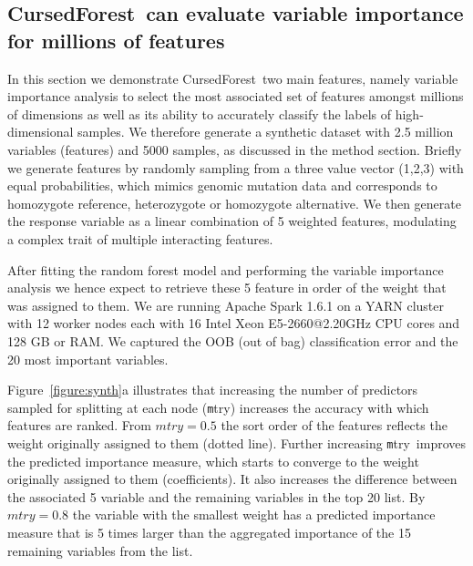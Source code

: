 \documentclass[10pt,letterpaper]{article}
\newcommand{\cursedforest}{{\sc CursedForest}}
\newcommand{\mtry}{{\texttt mtry}}
\newcommand{\ntree}{{\texttt ntree}}
\begin{document}
\subsection{\cursedforest\ can evaluate variable importance for millions of features}\label{synthetic}
In this section we demonstrate \cursedforest\ two main features, namely variable importance analysis to select the most
associated set of features amongst millions of dimensions as well as its ability to accurately classify the labels of
high-dimensional samples.
We therefore generate a synthetic dataset with 2.5 million variables (features) and 5000 samples, as discussed in the
method section.  Briefly we generate features by randomly sampling from a three value vector (1,2,3) with equal
probabilities, which mimics genomic mutation data and corresponds to homozygote reference, heterozygote or homozygote
alternative.  We then generate the response variable as a linear combination of 5 weighted features, modulating a
complex trait of multiple interacting features.

After fitting the random forest model and performing the variable importance analysis we hence expect to retrieve these
5 feature in order of the weight that was assigned to them.  We are running Apache Spark 1.6.1 on a YARN cluster with 12
worker nodes each with 16 Intel Xeon E5-2660@2.20GHz CPU cores and 128 GB or RAM.  We captured the OOB (out of bag)
classification error and the 20 most important variables.

Figure~\ref{figure:synth}a illustrates that increasing the number of predictors sampled for splitting at each node
(\mtry) increases the accuracy with which features are ranked.  From $mtry=0.5$ the sort order of the features reflects
the weight originally assigned to them (dotted line). Further increasing \mtry\ improves the predicted importance
measure, which starts to converge to the weight originally assigned to them (coefficients).  It also increases the
difference between the associated 5 variable and the remaining variables in the top 20 list.  By $mtry=0.8$ the variable
with the smallest weight has a predicted importance measure that is 5 times larger than the aggregated importance of the
15 remaining variables from the list.
\end{document}
